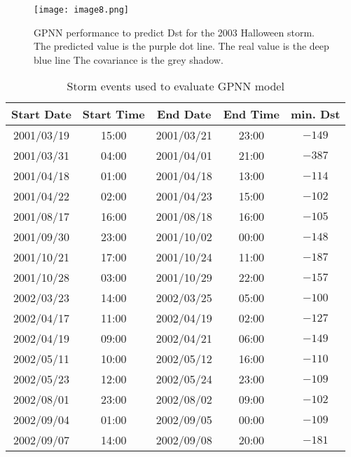 

\begin{figure}
	\texttt{[image: image8.png]}
	\caption{GPNN performance to predict Dst for the 2003 Halloween storm. The predicted value is the purple dot line. The real value is the deep blue line The covariance is the grey shadow.}
    \label{fig:gpnnhalloween}
\end{figure}




\begin{table}[h]
	\fontsize{8}{9.6}\selectfont
	\centering
	\caption{Storm events used to evaluate GPNN model}
	\label{table:teststormsgpnn}
	\begin{tabular}{ccccc}
	\hline
	Start Date & Start Time & End Date & End Time & min. Dst \\ \hline
	2001/03/19 & 15:00 & 2001/03/21 & 23:00 & $ -149 $ \\
	2001/03/31 & 04:00 & 2001/04/01 & 21:00 & $ -387 $ \\
	2001/04/18 & 01:00 & 2001/04/18 & 13:00 & $ -114 $ \\
	2001/04/22 & 02:00 & 2001/04/23 & 15:00 & $ -102 $ \\
	2001/08/17 & 16:00 & 2001/08/18 & 16:00 & $ -105 $ \\
	2001/09/30 & 23:00 & 2001/10/02 & 00:00 & $ -148 $ \\
	2001/10/21 & 17:00 & 2001/10/24 & 11:00 & $ -187 $ \\
	2001/10/28 & 03:00 & 2001/10/29 & 22:00 & $ -157 $ \\
	2002/03/23 & 14:00 & 2002/03/25 & 05:00 & $ -100 $ \\
	2002/04/17 & 11:00 & 2002/04/19 & 02:00 & $ -127 $ \\
	2002/04/19 & 09:00 & 2002/04/21 & 06:00 & $ -149 $ \\
	2002/05/11 & 10:00 & 2002/05/12 & 16:00 & $ -110 $ \\
	2002/05/23 & 12:00 & 2002/05/24 & 23:00 & $ -109 $ \\
	2002/08/01 & 23:00 & 2002/08/02 & 09:00 & $ -102 $ \\
	2002/09/04 & 01:00 & 2002/09/05 & 00:00 & $ -109 $ \\
	2002/09/07 & 14:00 & 2002/09/08 & 20:00 & $ -181 $ \\

\end{tabular}
\end{table}
